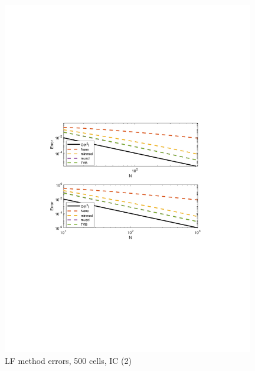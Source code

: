 \documentclass[11pt,a4paper]{article}
\begin{document}
\begin{figure}[!htb]
    \centering
    \includegraphics[width=11cm]{2_1_b_Roe_error.pdf}
    \caption{LF method errors, 500 cells, IC (2)}
    \label{fig:Roe_IC_1_error}
\end{figure}
\end{document}
